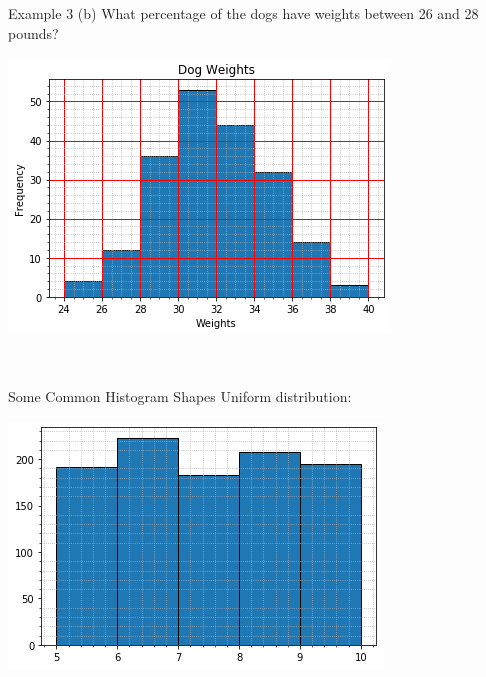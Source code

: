 \documentclass[t]{beamer}
\begin{document}
\begin{frame}{Example 3}
(b) \quad What percentage of the dogs have weights between 26 and 28 pounds?	\newline\\
\begin{minipage}{0.7\textwidth}
\includegraphics[scale=0.55]{../Images/dog_weights_hist.png}
\end{minipage}
\hspace{0.25cm}
\begin{minipage}{0.2\textwidth}
 \\[10pt]
\end{minipage}
\end{frame}


\begin{frame}{Some Common Histogram Shapes}
Uniform distribution:	\newline\\
\begin{center}
\includegraphics[scale=0.55]{../Images/uniform.png}
\end{center}
\end{frame}
\end{document}

